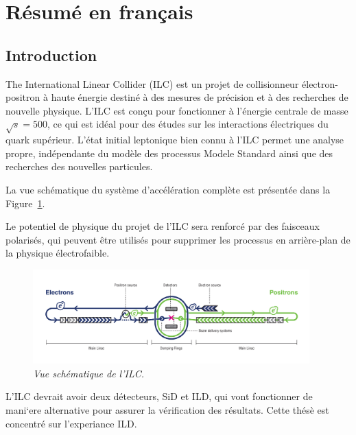 \section{R\'esum\'e en fran\c cais}

\renewcommand{\sm}{Modèle standard}
\subsection*{Introduction}


The International Linear Collider \cite{bib:ILC} (ILC) est un projet de collisionneur électron-positron à haute énergie destiné à des mesures de précision et à des recherches de nouvelle physique.
L'ILC est conçu pour fonctionner à l'énergie centrale de masse $\sqrt{s} = 500$\gev, ce qui est idéal pour des études sur les interactions électriques du quark supérieur.
L'état initial leptonique bien connu à l'ILC permet une analyse propre, indépendante du modèle des processus Modele Standard ainsi que des recherches des nouvelles particules.


La vue schématique du système d'accélération complète est présentée dans la Figure~\ref {fig:ILCSchemeF}.

Le potentiel de physique du projet de l'ILC sera renforcé par des faisceaux polarisés, qui peuvent être utilisés pour supprimer les processus en arrière-plan de la physique électrofaible.

\begin{figure}
	{\centering
		\includegraphics[width=0.95\textwidth]{graphics/ILC_scheme.jpg}
		\caption{\sl Vue sch\'ematique de l'ILC.}
		\label{fig:ILCSchemeF}
	}
\end{figure}

L’ILC devrait avoir deux d\'etecteurs, SiD et ILD, qui vont fonctionner de mani`ere alternative pour assurer la v\'erification des r\'esultats.
Cette th\'es\`e est concentr\'e sur l'experiance ILD. 

